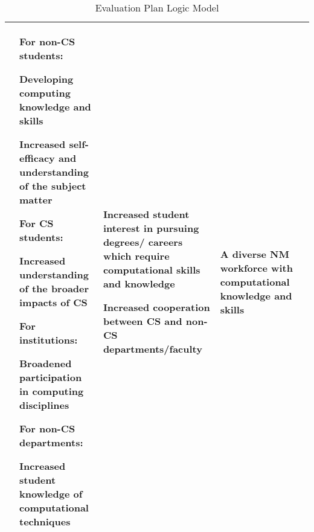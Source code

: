 \begin{table}[htb!]
\begin{tabular}{|p{1in}|p{1in}|p{1.5in}|p{1in}|p{1in}|}
    & 
    \textbf{For non-CS students:}

    Developing computing knowledge and skills 

    Increased self-efficacy and understanding of the subject matter

    \vspace{0.1in}
    \textbf{For CS students:}
    
    Increased understanding of the broader impacts of CS

    \vspace{0.1in}
    \textbf{For institutions:}
    
    Broadened participation in computing disciplines
    
    \vspace{0.1in}
    \textbf{For non-CS departments:}
    
    Increased student knowledge of computational techniques
    & 
    Increased student interest in pursuing degrees/ careers which require computational skills and knowledge  

    \vspace{0.1in}
    Increased cooperation between CS and non-CS departments/faculty

    & 
    A diverse NM workforce with computational knowledge and skills \\
    
\hline
\end{tabular}
\caption{Evaluation Plan Logic Model}
\label{tab:logic-model}
\end{table}

